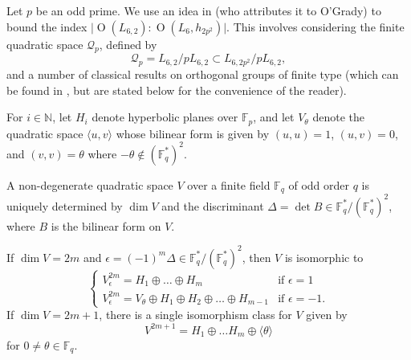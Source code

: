 \documentclass[11pt]{amsart}
\newcommand{\NN}{\mathbb{N}}
\newcommand{\FF}{\mathbb{F}}
\newcommand{\qc}{\mathcal{Q}}
\newcommand{\la}{\langle}
\newcommand{\ra}{\rangle}
\newcommand{\opn}{\operatorname}
\newcommand{\op}{\oplus}
\begin{document}
Let $p$ be an odd prime.
We use an idea in \cite{Kondo} (who attributes it to O'Grady) to bound the index $\vert \opn{O}(L_{6, 2}) : \opn{O}(L_{6}, h_{2p^2}) \vert$.
This involves considering the finite quadratic space $\qc_p$, defined by
\begin{equation*}
\qc_p  = L_{6,2}/pL_{6,2} \subset L_{6,2p^2} / pL_{6,2},
\end{equation*}
and a number of classical results on orthogonal groups of finite type
(which can be found in \cite{Dieudonne}, but are stated below for the convenience of the reader).

For $i \in \NN$, let $H_i$ denote hyperbolic planes over $\FF_p$, and let $V_{\theta}$ denote the quadratic space $\la u, v \ra$ whose bilinear form is given by $(u,u)=1$, $(u, v)=0$, and $(v, v) = \theta$ where $-\theta \notin (\FF_q^*)^2$.

A non-degenerate quadratic space $V$ over a finite field $\FF_q$ of odd order $q$ is uniquely determined by  $\opn{dim} V$ and the discriminant $\Delta = \opn{det }B \in \FF_q^* / (\FF_q^*)^2$, where $B$ is the bilinear form on $V$. 

If $\opn{dim} V=2m$ and $\epsilon= (-1)^m \Delta \in \FF_q^*/(\FF_q^*)^2$, then $V$ is isomorphic to 
\begin{equation*}
\begin{cases} 
V_{\epsilon}^{2m}  = H_1 \oplus \ldots \oplus  H_m & \text{if $\epsilon =1$} \\
 V_{\epsilon} ^{2m} = V_{\theta} \oplus H_1 \oplus H_2  \oplus \ldots \oplus H_{m-1} & \text{if $\epsilon = -1$}.
\end{cases}
\end{equation*}
If $\opn{dim} V = 2m+1$, there is a single isomorphism class for $V$ given by 
\begin{equation*}
V^{2m+1}=H_1 \op \ldots H_m \op \la \theta \ra
\end{equation*}
for $0 \neq \theta \in \FF_q$.
\end{document}
